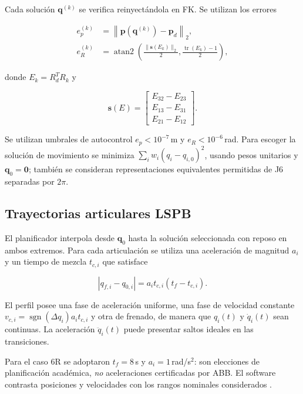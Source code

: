 \documentclass[conference]{IEEEtran}
\begin{document}
Cada solución $\bm q^{(k)}$ se verifica reinyectándola en FK. Se utilizan los errores

\begin{align}
e_p^{(k)}
&=\left\|
\bm p(\bm q^{(k)})-\bm p_d
\right\|_2,
\label{eq:ep}\\
e_R^{(k)}
&=\operatorname{atan2}\!
\left(
\frac{\|\bm s(E_k)\|_2}{2},
\frac{\operatorname{tr}(E_k)-1}{2}
\right),
\label{eq:er}
\end{align}

donde $E_k=R_d^TR_k$ y

\begin{equation*}
\bm s(E)=
\begin{bmatrix}
E_{32}-E_{23}\\
E_{13}-E_{31}\\
E_{21}-E_{12}
\end{bmatrix}.
\end{equation*}

Se utilizan umbrales de autocontrol $e_p<10^{-7}$\,m y $e_R<10^{-6}$\,rad. Para escoger la solución de movimiento se minimiza $\sum_i w_i(q_i-q_{i,0})^2$, usando pesos unitarios y $\bm q_0=\bm0$; también se consideran representaciones equivalentes permitidas de J6 separadas por $2\pi$.

\subsection{Trayectorias articulares LSPB}

El planificador interpola desde $\bm q_0$ hasta la solución seleccionada con reposo en ambos extremos. Para cada articulación se utiliza una aceleración de magnitud $a_i$ y un tiempo de mezcla $t_{c,i}$ que satisface

\begin{equation}
|q_{f,i}-q_{0,i}|
=a_i t_{c,i}(t_f-t_{c,i}).
\label{eq:tc}
\end{equation}

El perfil posee una fase de aceleración uniforme, una fase de velocidad constante $v_{c,i}=\operatorname{sgn}(\Delta q_i)a_i t_{c,i}$ y otra de frenado, de manera que $q_i(t)$ y $\dot q_i(t)$ sean continuas. La aceleración $\ddot q_i(t)$ puede presentar saltos ideales en las transiciones.

Para el caso 6R se adoptaron $t_f=8$\,s y $a_i=1$\,rad/s$^2$: son elecciones de planificación académica, \emph{no} aceleraciones certificadas por ABB. El software contrasta posiciones y velocidades con los rangos nominales considerados \cite{abbSpec}.
\end{document}
